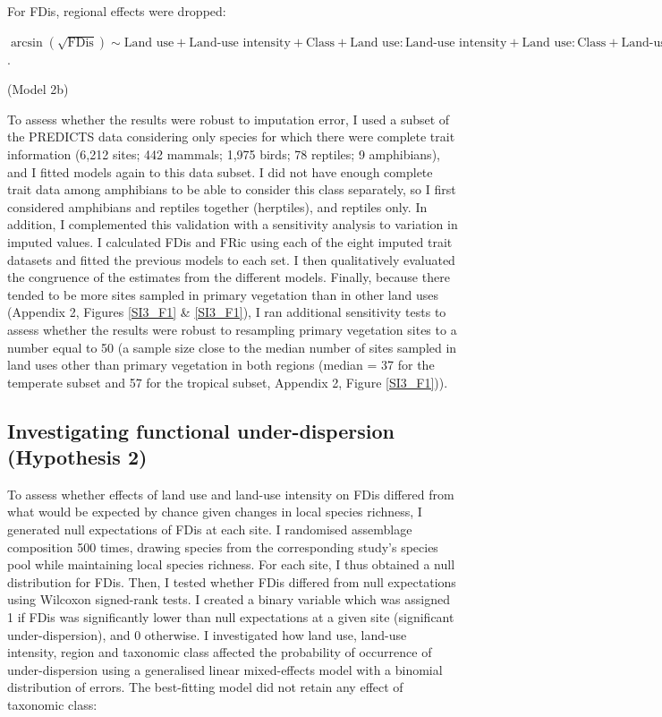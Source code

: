 For FDis, regional effects were dropped:
\begin{center}
$\arcsin(\sqrt{\text{FDis}})\sim \text{Land use} + \text{Land-use  intensity} + \text{Class} + \text{Land use}:\text{Land-use  intensity} + \text{Land use}:\text{Class} + \text{Land-use  intensity}:\text{Class}$.\\
\end{center}
\hspace*{\fill}(Model 2b)

To assess whether the results were robust to imputation error, I used a subset of the PREDICTS data considering only species for which there were complete trait information (6,212 sites; 442 mammals; 1,975 birds; 78 reptiles; 9 amphibians), and I fitted models again to this data subset. I did not have enough complete trait data among amphibians to be able to consider this class separately, so I first considered amphibians and reptiles together (herptiles), and reptiles only. In addition, I complemented this validation with a sensitivity analysis to variation in imputed values. I calculated FDis and FRic using each of the eight imputed trait datasets and fitted the previous models to each set. I then qualitatively evaluated the congruence of the estimates from the different models. Finally, because there tended to be more sites sampled in primary vegetation than in other land uses (Appendix 2, Figures \ref{SI3_F1} \& \ref{SI3_F1}), I ran additional sensitivity tests to assess whether the results were robust to resampling primary vegetation sites to a number equal to 50 (a sample size close to the median number of sites sampled in land uses other than primary vegetation in both regions (median = 37 for the temperate subset and 57 for the tropical subset, Appendix 2, Figure \ref{SI3_F1})).


\subsection{Investigating functional under-dispersion (Hypothesis 2)}

To assess whether effects of land use and land-use  intensity on FDis differed from what would be expected by chance given changes in local species richness, I generated null expectations of FDis at each site. I randomised assemblage composition 500 times, drawing species from the corresponding study's species pool while maintaining local species richness. For each site, I thus obtained a null distribution for FDis. Then, I tested whether FDis differed from null expectations using Wilcoxon signed-rank tests. I created a binary variable which was assigned 1 if FDis was significantly lower than null expectations at a given site (significant under-dispersion), and 0 otherwise. I investigated how land use, land-use intensity, region and taxonomic class affected the probability of occurrence of under-dispersion using a generalised linear mixed-effects model with a binomial distribution of errors. The best-fitting model did not retain any effect of taxonomic class:

